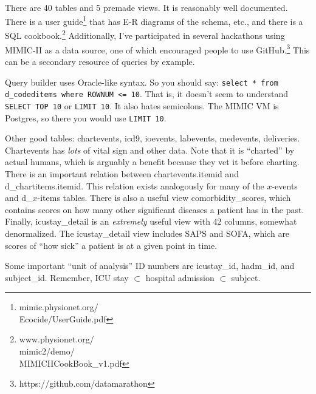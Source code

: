 \documentclass{tufte-handout}
\begin{document}
~\\

There are 40 tables and 5 premade views. It is reasonably well
documented. There is a user
guide\footnote{mimic.physionet.org/\\Ecocide/UserGuide.pdf} that has
E-R diagrams of the schema, etc., and there is a SQL
cookbook.\footnote{www.physionet.org/\\mimic2/demo/\\MIMICIICookBook\_v1.pdf}
Additionally, I've participated in several hackathons using MIMIC-II
as a data source, one of which encouraged people to use
GitHub.\footnote{https://github.com/datamarathon} This can be a
secondary resource of queries by example.

Query builder uses Oracle-like syntax. So you should say:
\texttt{select * from d\_codeditems where ROWNUM <= 10}. That is, it
doesn't seem to understand \texttt{SELECT TOP 10} or \texttt{LIMIT
  10}. It also hates semicolons. The MIMIC VM is Postgres, so there
you would use \texttt{LIMIT 10}. 

Other good tables: chartevents, icd9, ioevents, labevents, medevents, deliveries.
Chartevents has \emph{lots} of vital sign and other data. Note that it
is ``charted'' by actual humans, which is arguably a benefit because
they vet it before charting. There is an important relation between
chartevents.itemid and d\_chartitems.itemid. This relation exists
analogously for many of the $x$-events and d\_$x$-items tables. There
is also a useful view comorbidity\_scores, which contains scores on
how many other significant diseases a patient has in the past.
Finally, icustay\_detail is an \emph{extremely} useful view with 42
columns, somewhat denormalized. The icustay\_detail view includes SAPS
and SOFA, which are scores of ``how sick'' a patient is at a given
point in time.

Some important ``unit of analysis'' ID numbers are icustay\_id,
hadm\_id, and subject\_id. Remember, ICU stay $\subset$ hospital
admission $\subset$ subject. 
\end{document}
